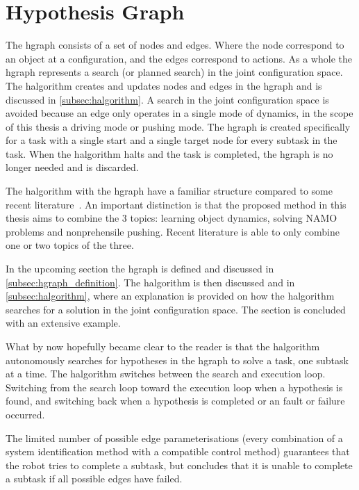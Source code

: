 \section{Hypothesis Graph}%
\label{sec:hgraph}
The \acf{hgraph} consists of a set of nodes and edges. Where the node correspond to an object at a configuration, and the edges correspond to actions. As a whole the \ac{hgraph} represents a search (or planned search) in the joint configuration space. The \ac{halgorithm} creates and updates nodes and edges in the \ac{hgraph} and is discussed in \cref{subsec:halgorithm}. A search in the joint configuration space is avoided because an edge only operates in a single mode of dynamics, in the scope of this thesis a driving mode or pushing mode. The \ac{hgraph} is created specifically for a task with a single start and a single target node for every subtask in the task. When the \ac{halgorithm} halts and the task is completed, the \ac{hgraph} is no longer needed and is discarded.\bs

The \ac{halgorithm} with the \ac{hgraph} have a familiar structure compared to some recent literature~\cite{ellis_navigation_2022,wang_affordancebased_2020}. An important distinction is that the proposed method in this thesis aims to combine the 3 topics: learning object dynamics, solving \ac{NAMO} problems and nonprehensile pushing. Recent literature is able to only combine one or two topics of the three.\bs

In the upcoming section the \ac{hgraph} is defined and discussed in \cref{subsec:hgraph_definition}. The \ac{halgorithm} is then discussed and in \cref{subsec:halgorithm}, where an explanation is provided on how the \ac{halgorithm} searches for a solution in the joint configuration space. The section is concluded with an extensive example.\bs





What by now hopefully became clear to the reader is that the \ac{halgorithm} autonomously searches for hypotheses in the \ac{hgraph} to solve a task, one subtask at a time. The \ac{halgorithm} switches between the search and execution loop. Switching from the search loop toward the execution loop when a hypothesis is found, and switching back when a hypothesis is completed or an fault or failure occurred.\bs

The limited number of possible edge parameterisations (every combination of a system identification method with a compatible control method) guarantees that the robot tries to complete a subtask, but concludes that it is unable to complete a subtask if all possible edges have failed.\bs

